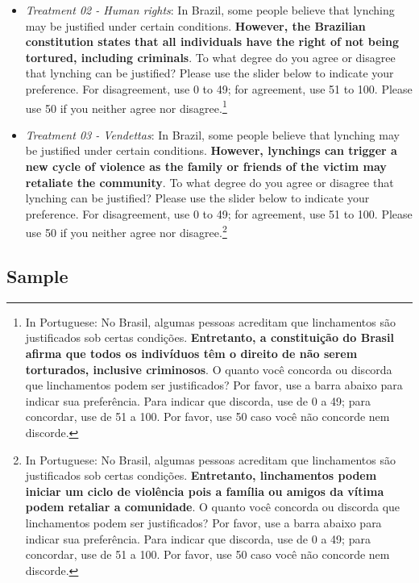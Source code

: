 \documentclass[12pt,a4paper,]{article}
\providecommand{\tightlist}{%
   \setlength{\itemsep}{0pt}\setlength{\parskip}{0pt}}
\begin{document}
\begin{itemize}
\tightlist
\item
  \emph{Treatment 02 - Human rights}: In Brazil, some people believe
  that lynching may be justified under certain conditions.
  \textbf{However, the Brazilian constitution states that all
  individuals have the right of not being tortured, including
  criminals}. To what degree do you agree or disagree that lynching can
  be justified? Please use the slider below to indicate your preference.
  For disagreement, use 0 to 49; for agreement, use 51 to 100. Please
  use 50 if you neither agree nor disagree.\footnote{In Portuguese: No
    Brasil, algumas pessoas acreditam que linchamentos são justificados
    sob certas condições. \textbf{Entretanto, a constituição do Brasil
    afirma que todos os indivíduos têm o direito de não serem
    torturados, inclusive criminosos}. O quanto você concorda ou
    discorda que linchamentos podem ser justificados? Por favor, use a
    barra abaixo para indicar sua preferência. Para indicar que
    discorda, use de 0 a 49; para concordar, use de 51 a 100. Por favor,
    use 50 caso você não concorde nem discorde.}
\end{itemize}

\begin{itemize}
\tightlist
\item
  \emph{Treatment 03 - Vendettas}: In Brazil, some people believe that
  lynching may be justified under certain conditions. \textbf{However,
  lynchings can trigger a new cycle of violence as the family or friends
  of the victim may retaliate the community}. To what degree do you
  agree or disagree that lynching can be justified? Please use the
  slider below to indicate your preference. For disagreement, use 0 to
  49; for agreement, use 51 to 100. Please use 50 if you neither agree
  nor disagree.\footnote{In Portuguese: No Brasil, algumas pessoas
    acreditam que linchamentos são justificados sob certas condições.
    \textbf{Entretanto, linchamentos podem iniciar um ciclo de violência
    pois a família ou amigos da vítima podem retaliar a comunidade}. O
    quanto você concorda ou discorda que linchamentos podem ser
    justificados? Por favor, use a barra abaixo para indicar sua
    preferência. Para indicar que discorda, use de 0 a 49; para
    concordar, use de 51 a 100. Por favor, use 50 caso você não concorde
    nem discorde.}
\end{itemize}

\hypertarget{sample-2}{%
\subsection{Sample}\label{sample-2}}
\end{document}
